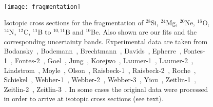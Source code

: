 \documentclass[a4paper,11pt]{article}
\begin{document}
\begin{figure}[htp]
\begin{center}
  \texttt{[image: fragmentation]}
\end{center}
\caption{Isotopic cross sections for the fragmentation of $^{28}$Si, $^{24}$Mg, $^{20}$Ne, $^{16}$O, $^{14}$N, $^{12}$C, $^{11}$B to $^{10,11}$B and $^{10}$Be. Also shown are our fits and the corresponding uncertainty bands. Experimental data are taken from Bodansky~\cite{Bodansky:1975}, Bodemann~\cite{Bodemann:1993}, Brechtmann~\cite{Brechtmann:1988rs}, Davids~\cite{Davids:1970wh}, Epherre~\cite{Epherre:1969qxr}, Fontes-1~\cite{Fontes:1977qq}, Fontes-2~\cite{Fontes:1971rn}, Goel~\cite{Goel:1969}, Jung~\cite{Jung:1970xr}, Korejwo~\cite{Korejwo:2000pf,Korejwo:2002ts}, Laumer-1~\cite{Laumer:1974zza}, Laumer-2~\cite{Laumer:1973zz}, Lindstrom~\cite{Lindstrom:1975mi}, Moyle~\cite{Moyle:1979zz}, Olson~\cite{Olson:1983jz}, Raisbeck-1~\cite{Raisbeck:1974zz}, Raisbeck-2~\cite{Raisbeck:1971ie}, Roche~\cite{Roche:1976zz}, Schiekel~\cite{Schiekel:1996}, Webber-1~\cite{Webber:1990kb}, Webber-2~\cite{Webber:1990kc}, Webber-3~\cite{Webber:1998}, Yiou~\cite{Yiou:1969}, Zeitlin-1~\cite{Zeitlin:2007sm}, Zeitlin-2~\cite{Zeitlin:2011qg}, Zeitlin-3~\cite{Zeitlin:2001ye}. In some cases the original data were processed in order to arrive at isotopic cross sections (see text).}
\label{fig:spallation}
\end{figure}
\end{document}
